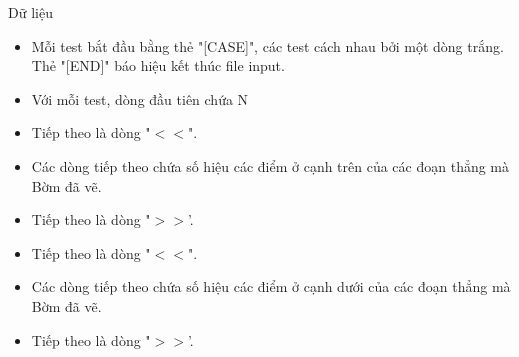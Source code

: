 Dữ liệu
\begin{itemize}
	\item     Mỗi test bắt đầu bằng thẻ "[CASE]", các test cách nhau bởi một dòng trắng. Thẻ "[END]" báo hiệu kết thúc file input.   
	\item     Với mỗi test, dòng đầu tiên chứa N   
	\item     Tiếp theo là dòng "$<$$<$".   
	\item     Các dòng tiếp theo chứa số hiệu các điểm ở cạnh trên của các đoạn thẳng mà Bờm đã vẽ.   
	\item     Tiếp theo là dòng "$>$$>$'.   
	\item     Tiếp theo là dòng "$<$$<$".   
	\item     Các dòng tiếp theo chứa số hiệu các điểm ở cạnh dưới của các đoạn thẳng mà Bờm đã vẽ.   
	\item     Tiếp theo là dòng "$>$$>$'.   
\end{itemize}